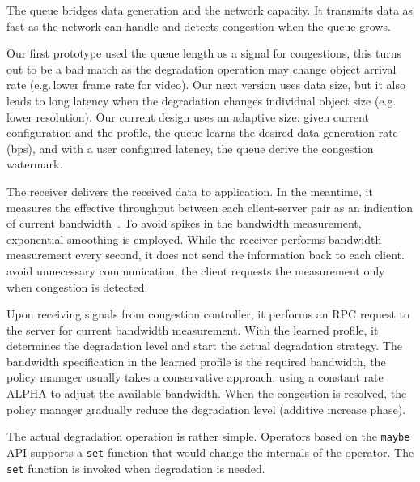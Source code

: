  The queue bridges data generation and
the network capacity. It transmits data as fast as the network can handle and
detects congestion when the queue grows.

 Our first prototype used the queue length as a
signal for congestions, this turns out to be a bad match as the degradation
operation may change object arrival rate (e.g.\,lower frame rate for video). Our
next version uses data size, but it also leads to long latency when the
degradation changes individual object size (e.g.\,lower resolution). Our current
design uses an adaptive size: given current configuration and the profile, the
queue learns the desired data generation rate (bps), and with a user configured
latency, the queue derive the congestion watermark.

 The receiver delivers the received data to
application. In the meantime, it measures the effective throughput between each
client-server pair as an indication of current bandwidth~\cite{iperf}. To avoid
spikes in the bandwidth measurement, exponential smoothing is employed. While
the receiver performs bandwidth measurement every second, it does not send the
information back to each client.  avoid unnecessary communication, the client
requests the measurement only when congestion is detected.

 Upon receiving signals from congestion controller, it
performs an RPC request to the server for current bandwidth measurement. With
the learned profile, it determines the degradation level and start the actual
degradation strategy. The bandwidth specification in the learned profile is the
required bandwidth, the policy manager usually takes a conservative approach:
using a constant rate ALPHA to adjust the available bandwidth. When the
congestion is resolved, the policy manager gradually reduce the degradation
level (additive increase phase).

 The actual degradation operation is rather simple. Operators
based on the \texttt{maybe} API supports a \texttt{set} function that would
change the internals of the operator. The \texttt{set} function is invoked when
degradation is needed.



